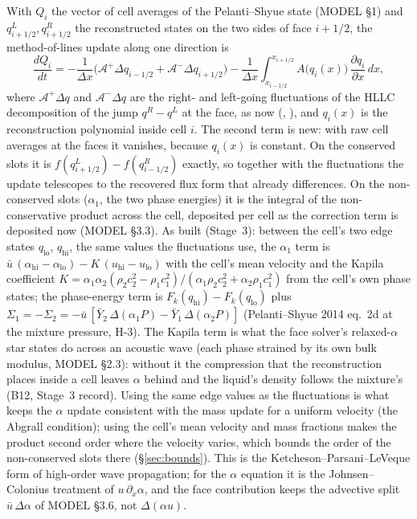 \documentclass[11pt,a4paper]{article}
\newcommand{\dd}[2]{\frac{\partial #1}{\partial #2}}
\newcommand{\Dx}{\Delta x}
\newcommand{\Ap}{\mathcal{A}^{+}}
\newcommand{\Am}{\mathcal{A}^{-}}
\begin{document}
With $Q_i$ the vector of cell averages of the Pelanti--Shyue state (MODEL
\S1) and $q^{L}_{i+1/2}, q^{R}_{i+1/2}$ the reconstructed states on the two
sides of face $i+1/2$, the method-of-lines update along one direction is
\begin{equation}
\label{eq:mol}
\frac{dQ_i}{dt} = -\frac{1}{\Dx}\Big(\Ap\Delta q_{i-1/2} + \Am\Delta q_{i+1/2}\Big)
                  -\frac{1}{\Dx}\int_{x_{i-1/2}}^{x_{i+1/2}} A\big(q_i(x)\big)\,\dd{q_i}{x}\,dx ,
\end{equation}
where $\Ap\Delta q$ and $\Am\Delta q$ are the right- and left-going
fluctuations of the HLLC decomposition of the jump $q^{R}-q^{L}$ at the
face, as now (, ), and $q_i(x)$ is the
reconstruction polynomial inside cell $i$.  The second term is new: with
raw cell averages at the faces it vanishes, because $q_i(x)$ is constant.
On the conserved slots it is $f(q^{L}_{i+1/2})-f(q^{R}_{i-1/2})$ exactly,
so together with the fluctuations the update telescopes to the recovered
flux form that  already differences.  On the
non-conserved slots ($\alpha_1$, the two phase energies) it is the
integral of the non-conservative product across the cell, deposited per
cell as the correction term is deposited now (MODEL \S3.3).  As built
(Stage~3): between the cell's two edge states $q_{\mathrm{lo}}$,
$q_{\mathrm{hi}}$, the same values the fluctuations use, the $\alpha_1$
term is $\bar u\,(\alpha_{\mathrm{hi}}-\alpha_{\mathrm{lo}}) - K\,(u_{\mathrm{hi}}-u_{\mathrm{lo}})$
with the cell's mean velocity and the Kapila coefficient
$K = \alpha_1\alpha_2(\rho_2c_2^2-\rho_1c_1^2)/(\alpha_1\rho_2c_2^2+\alpha_2\rho_1c_1^2)$
from the cell's own phase states; the phase-energy term is
$F_k(q_{\mathrm{hi}})-F_k(q_{\mathrm{lo}})$ plus
$\Sigma_1 = -\Sigma_2 = -\bar u\,[\bar Y_2\,\Delta(\alpha_1 P) - \bar Y_1\,\Delta(\alpha_2 P)]$
(Pelanti--Shyue 2014 eq.~2d at the mixture pressure, H-3).  The Kapila
term is what the face solver's relaxed-$\alpha$ star states do across an
acoustic wave (each phase strained by its own bulk modulus, MODEL
\S2.3): without it the compression that the reconstruction places inside
a cell leaves $\alpha$ behind and the liquid's density follows the
mixture's (B12, Stage~3 record).  Using the same edge values as the
fluctuations is what keeps the $\alpha$ update consistent with the mass
update for a uniform velocity (the Abgrall condition); using the cell's
mean velocity and mass fractions makes the product second order where
the velocity varies, which bounds the order of the non-conserved slots
there (\S\ref{sec:bounds}).  This is the Ketcheson--Parsani--LeVeque form
of high-order wave propagation; for the $\alpha$ equation it is the
Johnsen--Colonius treatment of $u\,\partial_x\alpha$, and the face
contribution keeps the advective split
$\bar u\,\Delta\alpha$ of MODEL \S3.6, not $\Delta(\alpha u)$.
\end{document}
